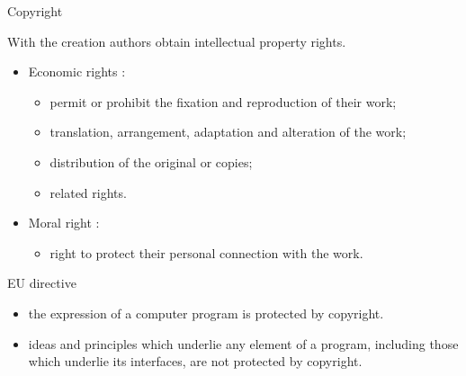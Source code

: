 \documentclass{beamer}
\begin{document}
\begin{frame}{Copyright}

With the creation authors obtain intellectual property rights.

  \begin{itemize}
  \item Economic rights :
    \begin{itemize}
    \item permit or prohibit the fixation and reproduction of their
      work;
    \item translation, arrangement, adaptation and alteration of the
      work;
    \item distribution of the original or copies;
    \item related rights.
    \end{itemize}
  \item Moral right :
    \begin{itemize}
    \item right to protect their personal connection with the work.
    
    \end{itemize}
  \end{itemize}

 
  \begin{alertblock}{EU directive}
    \begin{itemize}
    \item the expression of a computer program is protected by
      copyright.
    \item ideas and principles which underlie any element of a
      program, including those which underlie its interfaces, are not
      protected by copyright.
    \end{itemize}

  \end{alertblock}

\end{frame}
\end{document}

